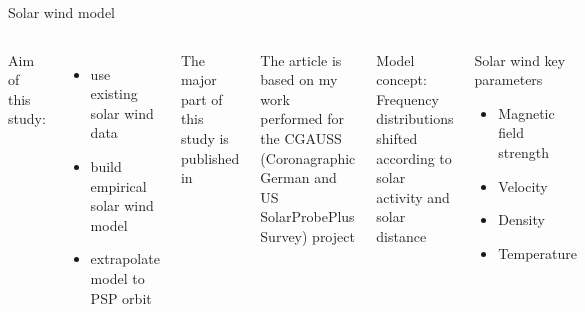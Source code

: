 \begin{frame}[plain,c]{Solar wind model}{}
	\begin{columns}[c]
		
		Aim of this study:
		\begin{itemize}
			\item use existing solar wind data
			\item build empirical solar wind model
			\item extrapolate model to PSP orbit
		\end{itemize}
		\vspace{1cm}
		The major part of this study is published in \citet{Venzmer2018}\\\ 
		
		The article is based on my work performed for the CGAUSS (Coronagraphic German and US SolarProbePlus Survey) project

		
		Model concept:\\
		Frequency distributions shifted according to solar activity and solar distance\\
		\begin{block}{Solar wind key parameters}
			\begin{itemize}
				\item Magnetic field strength
				\item Velocity
				\item Density
				\item Temperature
			\end{itemize}
		\end{block}
		
	\end{columns}
\end{frame}

